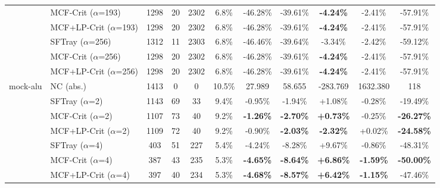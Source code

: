 \begin{table}[t]
{\begin{tabular}{ll|cccc|ccc|cc}
 & MCF-Crit ($\alpha$=193) & 1298 & 20 & 2302 & 6.8\% & -46.28\% & -39.61\% & \textbf{-4.24\%} & -2.41\% & -57.91\% \\

 & MCF+LP-Crit ($\alpha$=193) & 1298 & 20 & 2302 & 6.8\% & -46.28\% & -39.61\% & \textbf{-4.24\%} & -2.41\% & -57.91\% \\

\addlinespace[0.5em]

 & SFTray ($\alpha$=256) & 1312 & 11 & 2303 & 6.8\% & -46.46\% & -39.64\% & -3.34\% & -2.42\% & -59.12\% \\

 & MCF-Crit ($\alpha$=256) & 1298 & 20 & 2302 & 6.8\% & -46.28\% & -39.61\% & \textbf{-4.24\%} & -2.41\% & -57.91\% \\

 & MCF+LP-Crit ($\alpha$=256) & 1298 & 20 & 2302 & 6.8\% & -46.28\% & -39.61\% & \textbf{-4.24\%} & -2.41\% & -57.91\% \\

\midrule

\multirow{25}{*}{mock-alu} & NC (abs.) & 1413 & 0 & 0 & 10.5\% & 27.989 & 58.655 & -283.769 & 1632.380 & 118 \\

\addlinespace[0.4em]

 & SFTray ($\alpha$=2) & 1143 & 69 & 33 & 9.4\% & -0.95\% & -1.94\% & +1.08\% & -0.28\% & -19.49\% \\

 & MCF-Crit ($\alpha$=2) & 1107 & 73 & 40 & 9.2\% & \textbf{-1.26\%} & \textbf{-2.70\%} & \textbf{+0.73\%} & -0.25\% & \textbf{-26.27\%} \\

 & MCF+LP-Crit ($\alpha$=2) & 1109 & 72 & 40 & 9.2\% & -0.90\% & \textbf{-2.03\%} & \textbf{-2.32\%} & +0.02\% & \textbf{-24.58\%} \\

\addlinespace[0.5em]

 & SFTray ($\alpha$=4) & 403 & 51 & 227 & 5.4\% & -4.24\% & -8.28\% & +9.67\% & -0.86\% & -48.31\% \\

 & MCF-Crit ($\alpha$=4) & 387 & 43 & 235 & 5.3\% & \textbf{-4.65\%} & \textbf{-8.64\%} & \textbf{+6.86\%} & \textbf{-1.59\%} & \textbf{-50.00\%} \\

 & MCF+LP-Crit ($\alpha$=4) & 397 & 40 & 234 & 5.3\% & \textbf{-4.68\%} & \textbf{-8.57\%} & \textbf{+6.42\%} & \textbf{-1.15\%} & -47.46\% \\


\end{tabular}}
\end{table}
